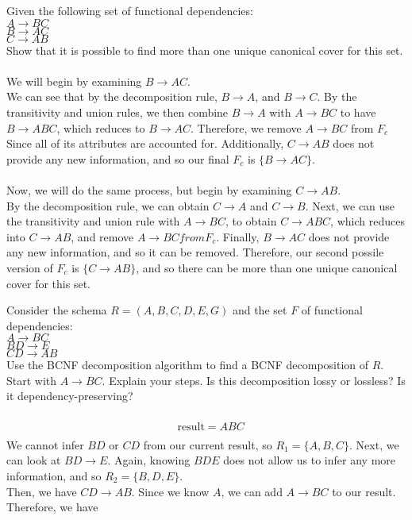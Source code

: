 \documentclass[a4 paper]{article}
\begin{document}
Given the following set of functional dependencies:\\
$A \rightarrow BC$\\
$B \rightarrow AC$\\
$C \rightarrow AB$\\
Show that it is possible to find more than one unique canonical cover for this set.\\\\
We will begin by examining $B\rightarrow AC$.\\
We can see that by the decomposition rule, $B\rightarrow A$, and $B\rightarrow C$. By the transitivity and union rules, we then combine $B\rightarrow A$ with $A\rightarrow BC$ to have $B\rightarrow ABC$, which reduces to $B\rightarrow AC$. Therefore, we remove $A\rightarrow BC$ from $F_c$ Since all of its attributes are accounted for. Additionally, $C\rightarrow AB$ does not provide any new information, and so our final $F_c$ is $\{B\rightarrow AC\}$.\\\\
Now, we will do the same process, but begin by examining $C\rightarrow AB$.\\
By the decomposition rule, we can obtain $C\rightarrow A$ and $C\rightarrow B$. Next, we can use the transitivity and union rule with $A\rightarrow BC$, to obtain $C\rightarrow ABC$, which reduces into $C\rightarrow AB$, and remove $A\rightarrow BC from F_c$. Finally, $B\rightarrow AC$ does not provide any new information, and so it can be removed. Therefore, our second possile version of $F_c$ is $\{C\rightarrow AB\}$, and so there can be more than one unique canonical cover for this set.



Consider the schema $R = (A, B, C, D, E, G)$ and the set $F$ of functional dependencies:\\
$A \rightarrow BC$\\
$BD \rightarrow E$\\
$CD \rightarrow AB$\\
Use the BCNF decomposition algorithm to find a BCNF decomposition of $R$. Start with $A \rightarrow BC$. Explain your steps. Is this decomposition lossy or lossless? Is it dependency-preserving?\\\\
\begin{align*}
  &\text{result} = ABC\\
\end{align*}
We cannot infer $BD$ or $CD$ from our current result, so $R_1=\{A,B,C\}$.
Next, we can look at $BD\rightarrow E$. Again, knowing $BDE$ does not allow us to infer any more information, and so $R_2=\{B,D,E\}$.\\
Then, we have $CD\rightarrow AB$. Since we know $A$, we can add $A\rightarrow BC$ to our result. Therefore, we have 
\end{document}
